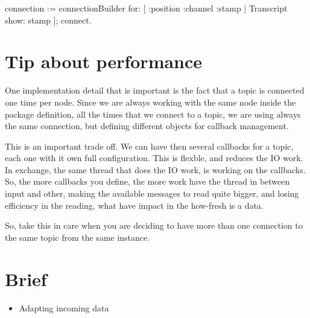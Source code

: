 \documentclass[a4paper,10pt,twoside]{book}
\begin{document}
{\begin{code}
						connection := connectionBuilder for: [ :position :channel :stamp |  Transcript show: stamp  ];	connect.
						\end{code}						
						
					\section{Tip about performance}
					
					
						One implementation detail that is important is the fact that a topic is connected one time per node. Since we are always working with the same node inside the package definition, all the times that we connect to a topic, we are using always the same connection, but defining different objects for callback management. 
						
						This is an important trade off. We can have then several callbacks for a topic, each one with it own full configuration. This is flexble, and reduces the IO work. 
						In exchange, the same thread that does the IO work, is working on the callbacks. So, the more callbacks you define, the more work have the thread in between input and other, making the available messages to read quite bigger, and losing efficiency in the reading, what have impact in the how-fresh is a data.
						
						So, take this in care when you are deciding to have more than one connection to the same topic from the same instance.
						
					
					
					
					\section {Brief}
					
						\begin{itemize}
							\item Adapting incoming data\begin{itemize}
							

\end{itemize}
\end{itemize}}
\end{document}

